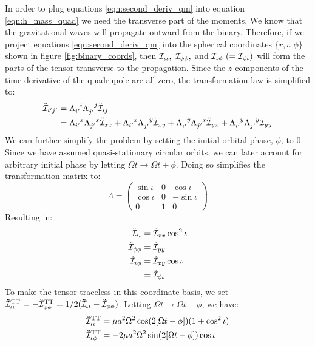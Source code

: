 In order to plug equations \ref{eqn:second_deriv_qm} into equation \ref{eqn:h_mass_quad} we need the transverse part of the moments. We know that the gravitational waves will propagate outward from the binary. Therefore, if we project equations \ref{eqn:second_deriv_qm} into the spherical coordinates $\{r,\iota,\phi\}$ shown in figure \ref{fig:binary_coords}, then $\mathcal{I}_{\iota\iota},~\mathcal{I}_{\phi\phi},$ and $\mathcal{I}_{\iota\phi}~ (= \mathcal{I}_{\phi\iota})$ will form the parts of the tensor transverse to the propagation. Since the $z$ components of the time derivative of the quadrupole are all zero, the transformation law is simplified to:
\begin{align*}
\ddot{\qI}_{i'j'}  &= \Lambda\indices{_{i'}^i} \Lambda\indices{_{j'}^j} \ddot{\qI}_{ij} \\
            &= \Lambda\indices{_{i'}^x} \Lambda\indices{_{j'}^x} \ddot{\qI}_{xx} + \Lambda\indices{_{i'}^x} \Lambda\indices{_{j'}^y} \ddot{\qI}_{xy} + \Lambda\indices{_{i'}^y} \Lambda\indices{_{j'}^x} \ddot{\qI}_{yx} + \Lambda\indices{_{i'}^y} \Lambda\indices{_{j'}^y} \ddot{\qI}_{yy}
\end{align*}
We can further simplify the problem by setting the initial orbital phase, $\phi$, to 0. Since we have assumed quasi-stationary circular orbits, we can later account for arbitrary initial phase by letting $\Omega t \rightarrow \Omega t + \phi$. Doing so simplifies the transformation matrix to:
\begin{equation*}
\Lambda = \begin{pmatrix}
    \sin \iota &    0    &  \cos \iota \\
    \cos \iota &    0    &  -\sin \iota \\
         0     &    1    &    0
    \end{pmatrix}
\end{equation*}
Resulting in:
\begin{align*}
\ddot{\mathcal{I}}_{\iota\iota} &= \ddot{\mathcal{I}}_{xx} \cos^2\iota \\
\ddot{\mathcal{I}}_{\phi\phi}   &= \ddot{\mathcal{I}}_{yy} \\
\ddot{\mathcal{I}}_{\iota\phi}  &= \ddot{\mathcal{I}}_{xy} \cos \iota \\
                        &= \ddot{\mathcal{I}}_{\phi\iota}
\end{align*}
To make the tensor traceless in this coordinate basis, we set $\ddot{\mathcal{I}}^{\mathrm{TT}}_{\iota\iota} = -\ddot{\mathcal{I}}^{\mathrm{TT}}_{\phi\phi} = 1/2(\ddot{\mathcal{I}}_{\iota\iota} - \ddot{\mathcal{I}}_{\phi\phi})$. Letting $\Omega t \rightarrow \Omega t - \phi$, we have:
\begin{align}
\ddot{\mathcal{I}}^{\mathrm{TT}}_{\iota\iota} &= \mu a^2 \Omega^2 \cos(2[\Omega t - \phi])(1 + \cos^2\iota) \\
\ddot{\mathcal{I}}^{\mathrm{TT}}_{\iota\phi}  &= -2 \mu a^2 \Omega^2 \sin(2[\Omega t - \phi])\cos\iota
\end{align}
